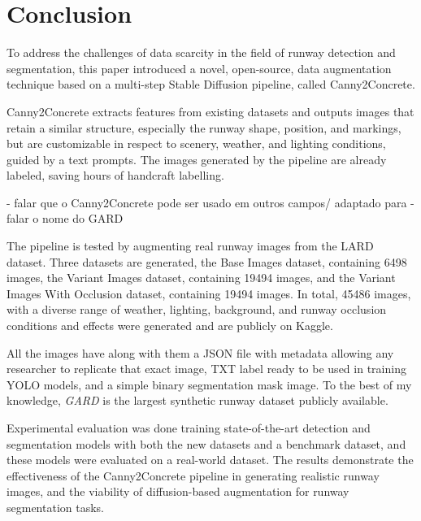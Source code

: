 \chapter{Conclusion}

To address the challenges of data scarcity in the field of runway detection and segmentation,
this paper introduced a novel, open-source, data augmentation technique based on a multi-step
Stable Diffusion pipeline, called Canny2Concrete.

Canny2Concrete extracts features from existing datasets and outputs images
that retain a similar structure, especially the runway shape, position, and markings, but are
customizable in respect to scenery, weather, and lighting conditions, guided by
a text prompts. The images generated by the pipeline are already
labeled, saving hours of handcraft labelling.

- falar que o Canny2Concrete pode ser usado em outros campos/ adaptado para
- falar o nome do GARD

The pipeline is tested by augmenting real runway images from the LARD \cite{ducoffe_lard_2023}
dataset. Three datasets are generated, the Base Images dataset,
containing 6498 images, the Variant Images dataset, containing 19494 images, and
the Variant Images With Occlusion dataset, containing 19494 images. In total,
45486 images, with a diverse range of weather, lighting, background, and runway
occlusion conditions and effects were generated and are publicly on Kaggle.

All the images have along with
them a JSON file
with metadata allowing any researcher to replicate that exact image, TXT label
ready to be used in training YOLO models, and a simple binary segmentation mask
image. To the best of my knowledge, \emph{GARD} is the largest synthetic runway
dataset publicly available.

Experimental evaluation was done training state-of-the-art detection and
segmentation models with both the new datasets and a benchmark dataset, and
these models were evaluated on a real-world dataset. The results demonstrate
the effectiveness of the Canny2Concrete pipeline in generating realistic runway
images, and the viability of diffusion-based augmentation for runway segmentation
tasks.

